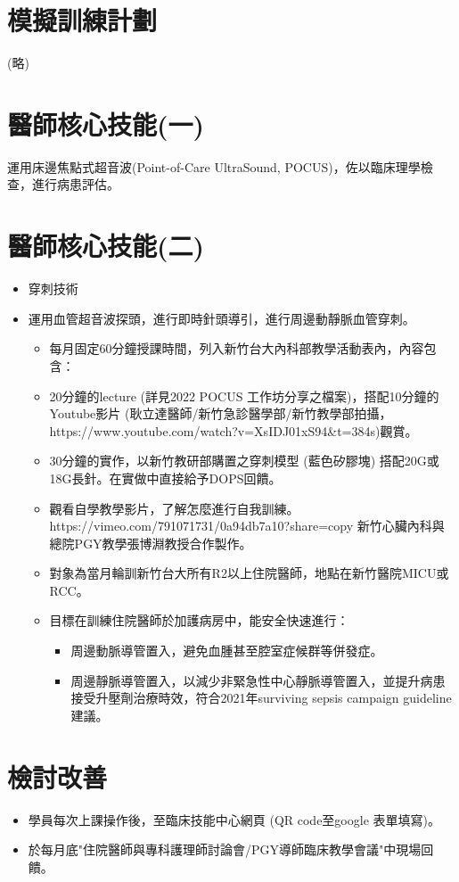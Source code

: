\documentclass[12pt,a4paper]{article}
\begin{document}
\section{模擬訓練計劃}
(略)

\section{醫師核心技能(一)}
運用床邊焦點式超音波(Point-of-Care UltraSound, POCUS)，佐以臨床理學檢查，進行病患評估。

\section{醫師核心技能(二)}
\begin{itemize}
    \item 穿刺技術
    \item 運用血管超音波探頭，進行即時針頭導引，進行周邊動靜脈血管穿刺。
    \begin{itemize}
        \item 每月固定60分鐘授課時間，列入新竹台大內科部教學活動表內，內容包含：
        \item 20分鐘的lecture (詳見2022 POCUS 工作坊分享之檔案)，搭配10分鐘的Youtube影片 (耿立達醫師/新竹急診醫學部/新竹教學部拍攝，https://www.youtube.com/watch?v=XsIDJ01xS94\&t=384s)觀賞。
        \item 30分鐘的實作，以新竹教研部購置之穿刺模型 (藍色矽膠塊) 搭配20G或18G長針。在實做中直接給予DOPS回饋。
        \item 觀看自學教學影片，了解怎麼進行自我訓練。https://vimeo.com/791071731/0a94db7a10?share=copy 新竹心臟內科與總院PGY教學張博淵教授合作製作。
        \item 對象為當月輪訓新竹台大所有R2以上住院醫師，地點在新竹醫院MICU或RCC。
        \item 目標在訓練住院醫師於加護病房中，能安全快速進行：
        \begin{itemize}
            \item 周邊動脈導管置入，避免血腫甚至腔室症候群等併發症。
            \item 周邊靜脈導管置入，以減少非緊急性中心靜脈導管置入，並提升病患接受升壓劑治療時效，符合2021年surviving sepsis campaign guideline建議。
        \end{itemize}
    \end{itemize}
\end{itemize}

\section{檢討改善}
\begin{itemize}
    \item 學員每次上課操作後，至臨床技能中心網頁 (QR code至google 表單填寫)。
    \item 於每月底"住院醫師與專科護理師討論會/PGY導師臨床教學會議"中現場回饋。 
\end{itemize}
\end{document}
